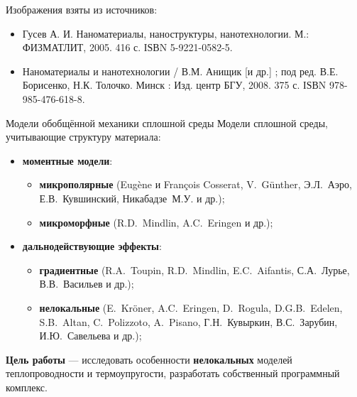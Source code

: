 \begin{frame}
	\bigskip	
	
	Изображения взяты из источников:
\begin{itemize}
	\justifying
	\item Гусев А. И. Наноматериалы, наноструктуры, нанотехнологии. М.: ФИЗМАТЛИТ, 2005. 416 с. ІЅВN 5-9221-0582-5.
	\item Наноматериалы и нанотехнологии / В.М. Анищик [и др.] ; под ред. В.Е. Борисенко, Н.К. Толочко. Минск : Изд. центр БГУ, 2008. 375 с. ІЅВN 978-985-476-618-8.
\end{itemize}
\end{frame}

\begin{frame}{Модели обобщённой механики сплошной среды}
	Модели сплошной среды, учитывающие структуру материала:
	\begin{itemize}
		\item \textbf{моментные модели}:
		\begin{itemize}
			\justifying
			\item \textbf{микрополярные} (Eugène и François Cosserat, V.~G{\"u}nther, Э.Л.~Аэро, Е.В.~Кувшинский, Никабадзе~М.У. и др.);
			\item \textbf{микроморфные} (R.D.~Mindlin, A.C.~Eringen и др.);
		\end{itemize}
		\item \textbf{дальнодействующие эффекты}:
		\begin{itemize}
			\justifying
			\item \textbf{градиентные} (R.A.~Toupin, R.D.~Mindlin, E.C.~Aifantis, С.А.~Лурье, В.В.~Васильев и др.);
			\item \textbf{нелокальные} (E.~Kr{\"o}ner, A.C.~Eringen, D.~Rogula, D.G.B.~Edelen, S.B.~Altan, C.~Polizzoto, A.~Pisano, Г.Н.~Кувыркин, В.С.~Зарубин, И.Ю.~Савельева и др.);
		\end{itemize}
	\end{itemize}
	
	\justifying
	\bigskip
	\textbf{Цель работы} --- исследовать особенности \textbf{нелокальных} моделей теплопроводности и термоупругости, разработать собственный программный комплекс.
	

\end{frame}
